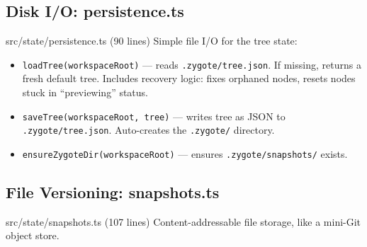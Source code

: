 \documentclass[12pt, a4paper]{article}
\begin{document}
\subsection{Disk I/O: persistence.ts}

\begin{filebox}{src/state/persistence.ts \quad (90 lines)}
Simple file I/O for the tree state:

\begin{itemize}
    \item \texttt{loadTree(workspaceRoot)} --- reads \texttt{.zygote/tree.json}. If missing, returns a fresh default tree. Includes recovery logic: fixes orphaned nodes, resets nodes stuck in ``previewing'' status.
    \item \texttt{saveTree(workspaceRoot, tree)} --- writes tree as JSON to \texttt{.zygote/tree.json}. Auto-creates the \texttt{.zygote/} directory.
    \item \texttt{ensureZygoteDir(workspaceRoot)} --- ensures \texttt{.zygote/snapshots/} exists.
\end{itemize}
\end{filebox}

\subsection{File Versioning: snapshots.ts}

\begin{filebox}{src/state/snapshots.ts \quad (107 lines)}
Content-addressable file storage, like a mini-Git object store.
\end{filebox}

\begin{center}
\end{center}
\end{document}

